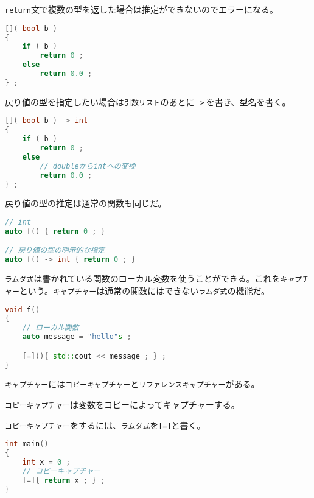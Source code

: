 \texttt{return}文で複数の型を返した場合は推定ができないのでエラーになる。

\begin{lstlisting}[language={C++}]
[]( bool b )
{
    if ( b )
        return 0 ;
    else
        return 0.0 ;
} ;
\end{lstlisting}

戻り値の型を指定したい場合は\texttt{引数リスト}のあとに\,\texttt{->}\,を書き、型名を書く。

\begin{lstlisting}[language={C++}]
[]( bool b ) -> int
{
    if ( b )
        return 0 ;
    else
        // doubleからintへの変換
        return 0.0 ;
} ;
\end{lstlisting}

戻り値の型の推定は通常の関数も同じだ。

\begin{lstlisting}[language={C++}]
// int
auto f() { return 0 ; }

// 戻り値の型の明示的な指定
auto f() -> int { return 0 ; }
\end{lstlisting}


\texttt{ラムダ式}は書かれている関数のローカル変数を使うことができる。これを\texttt{キャプチャー}という。\texttt{キャプチャー}は通常の関数にはできない\texttt{ラムダ式}の機能だ。

\begin{lstlisting}[language={C++}]
void f()
{
    // ローカル関数
    auto message = "hello"s ;

    [=](){ std::cout << message ; } ;
}
\end{lstlisting}

\texttt{キャプチャー}には\texttt{コピーキャプチャー}と\texttt{リファレンスキャプチャー}がある。


\texttt{コピーキャプチャー}は変数をコピーによってキャプチャーする。

\texttt{コピーキャプチャー}をするには、\texttt{ラムダ式}を\texttt{[=]}と書く。

\begin{lstlisting}[language={C++}]
int main()
{
    int x = 0 ;
    // コピーキャプチャー
    [=]{ return x ; } ;
}
\end{lstlisting}

